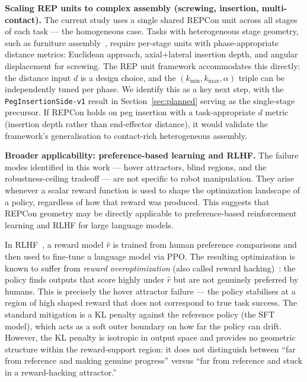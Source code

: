 \documentclass{article}
\begin{document}
\textbf{Scaling REP units to complex assembly (screwing, insertion, multi-contact).}
The current study uses a single shared REPCon unit across all stages of each task ---
the homogeneous case. Tasks with heterogeneous stage geometry, such as furniture
assembly~\citep{heo2023furniturebench}, require per-stage units with phase-appropriate
distance metrics: Euclidean approach, axial+lateral insertion depth, and angular
displacement for screwing. The REP unit framework accommodates this directly: the
distance input $d$ is a design choice, and the $(k_{\min}, k_{\max}, \alpha)$ triple
can be independently tuned per phase. We identify this as a key next step, with the
\texttt{PegInsertionSide-v1} result in Section~\ref{sec:planned} serving as the
single-stage precursor. If REPCon holds on peg insertion with a task-appropriate $d$
metric (insertion depth rather than end-effector distance), it would validate the
framework's generalisation to contact-rich heterogeneous assembly.

\textbf{Broader applicability: preference-based learning and RLHF.}
The failure modes identified in this work --- hover attractors, blind regions, and the
robustness-ceiling tradeoff --- are not specific to robot manipulation. They arise
whenever a scalar reward function is used to shape the optimization landscape of a
policy, regardless of how that reward was produced. This suggests that REPCon geometry
may be directly applicable to preference-based reinforcement learning and RLHF for
large language models.

In RLHF~\citep{stiennon2020learning,ouyang2022instructgpt}, a reward model $\hat{r}$ is
trained from human preference comparisons and then used to fine-tune a language model via
PPO. The resulting optimization is known to suffer from \emph{reward overoptimization}
(also called reward hacking)~\citep{gao2023scaling}: the policy finds outputs that score
highly under $\hat{r}$ but are not genuinely preferred by humans. This is precisely the
hover attractor failure --- the policy stabilises at a region of high shaped reward that
does not correspond to true task success. The standard mitigation is a KL penalty against
the reference policy (the SFT model), which acts as a soft outer boundary on how far the
policy can drift. However, the KL penalty is isotropic in output space and provides no
geometric structure within the reward-support region: it does not distinguish between
``far from reference and making genuine progress'' versus ``far from reference and stuck
in a reward-hacking attractor.''
\end{document}
